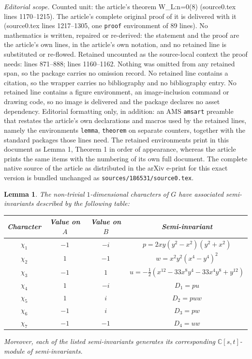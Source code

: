 \documentclass[10pt,a4paper]{amsart}
\newtheorem{lemma}{Lemma}
\begin{document}
\noindent\textit{Editorial scope.} Counted unit: the article's theorem W\_L:n=0(8) (source0.tex lines 1170--1215). The article's complete original proof of it is delivered with it (source0.tex lines 1217--1305, one \texttt{proof} environment of 89 lines). No mathematics is written, repaired or re-derived: the statement and the proof are the article's own lines, in the article's own notation, and no retained line is substituted or re-flowed.  Retained uncounted as the source-local context the proof needs: lines 871--888; lines 1160--1162.  Nothing was omitted from any retained span, so the package carries no omission record.  No retained line contains a citation, so the wrapper carries no bibliography and no bibliography entry.  No retained line contains a figure environment, an image-inclusion command or drawing code, so no image is delivered and the package declares no asset dependency.  Editorial formatting only, in addition: an AMS \texttt{amsart} preamble that restates the article's own declarations and macros used by the retained lines, namely the environments \texttt{lemma}, \texttt{theorem} on separate counters, together with the standard packages those lines need.  The retained environments print in this document as Lemma 1, Theorem 1 in order of appearance, whereas the article prints the same items with the numbering of its own full document.  The complete native source of the article as distributed in the arXiv e-print for this exact version is bundled unchanged as \texttt{sources/186531/source0.tex}.
\begin{lemma}\label{semi-invGI}
    The non-trivial \(1\)-dimensional characters of \(G\) have associated semi-invariants described by the following table:
    \begin{center}
        \begin{tabular}{|c|c|c|c|}
            \hline
             Character & Value on \(A\) & Value on \(B\) & Semi-invariant \\ \hline
             \(\chi_1\) & \(-1\) & \(-i\) & \(p = 2xy(y^2-x^2)(y^2+x^2)\) \\
             \(\chi_2\) & \(1\) & \(-1\) & \(w = x^2y^2(x^4-y^4)^2\) \\ 
             \(\chi_3\) & \(-1\) & \(1\) & \(u = -\frac{1}{2}(x^{12} - 33x^8y^4 - 33x^4y^8 + y^{12})\) \\ 
             \(\chi_4\) & \(1\) & \(-i\) & \(D_1 = pu\) \\ 
             \(\chi_5\) & \(1\) & \(i\) & \(D_2 = puw\) \\ 
             \(\chi_6\) & \(-1\) & \(i\) & \(D_3 = pw\) \\ 
             \(\chi_7\) & \(-1\) & \(-1\) & \(D_4 = uw\) \\ 
             \hline
        \end{tabular}
    \end{center}
    Moreover, each of the listed semi-invariants generates its corresponding \(\mathbb{C}[s,t]\)-module of semi-invariants.
\end{lemma}
\end{document}
